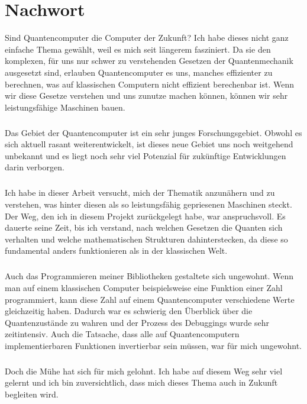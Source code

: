 \chapter{Nachwort}
Sind Quantencomputer die Computer der Zukunft? Ich habe dieses nicht ganz einfache Thema gewählt, weil es mich seit längerem fasziniert. Da sie den komplexen, für uns nur schwer zu verstehenden Gesetzen der Quantenmechanik ausgesetzt sind, erlauben Quantencomputer es uns, manches effizienter zu berechnen, was auf klassischen Computern nicht effizient berechenbar ist.  Wenn wir diese Gesetze verstehen und uns zunutze machen können, können wir sehr leistungsfähige Maschinen bauen.
\paragraph{} 
\noindent Das Gebiet der Quantencomputer ist ein sehr junges Forschungsgebiet. Obwohl es sich aktuell rasant weiterentwickelt, ist dieses neue Gebiet uns noch weitgehend unbekannt und es liegt noch sehr viel Potenzial für zukünftige Entwicklungen darin verborgen.
\paragraph{}
\noindent Ich habe in dieser Arbeit versucht, mich der Thematik anzunähern und zu verstehen, was hinter diesen als so leistungsfähig gepriesenen Maschinen steckt. Der Weg, den ich in diesem Projekt zurückgelegt habe, war anspruchsvoll. Es dauerte seine Zeit, bis ich verstand, nach welchen Gesetzen die Quanten sich verhalten und welche mathematischen Strukturen dahinterstecken, da diese so fundamental anders funktionieren als in der klassischen Welt.
\paragraph{}
\noindent Auch das Programmieren meiner Bibliotheken gestaltete sich ungewohnt. Wenn man auf einem klassischen Computer beispielsweise eine Funktion einer Zahl programmiert,  kann diese Zahl auf einem Quantencomputer verschiedene Werte gleichzeitig haben. Dadurch war es schwierig den Überblick über die Quantenzustände zu wahren und der Prozess des Debuggings wurde sehr zeitintensiv. Auch die Tatsache, dass alle auf Quantencomputern implementierbaren Funktionen invertierbar sein müssen, war für mich ungewohnt. 
\paragraph{}
\noindent Doch die Mühe hat sich für mich gelohnt. Ich habe auf diesem Weg sehr viel gelernt und ich bin zuversichtlich, dass mich dieses Thema auch in Zukunft begleiten wird.
